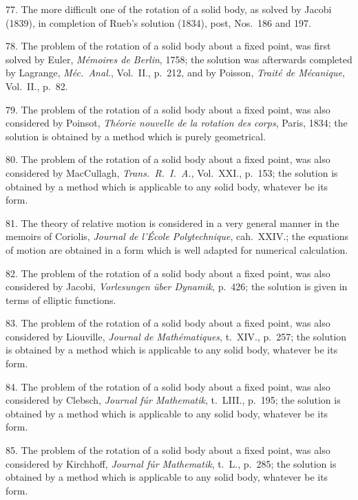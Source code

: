 \documentclass[11pt,a4paper]{article}
\begin{document}
77. The more difficult one of the rotation of a solid body, as solved by Jacobi (1839), in completion of Rueb's solution (1834), post, Nos.~186 and 197.

78. The problem of the rotation of a solid body about a fixed point, was first solved by Euler, \textit{M\'emoires de Berlin}, 1758; the solution was afterwards completed by Lagrange, \textit{M\'ec.\ Anal.}, Vol.~II., p.~212, and by Poisson, \textit{Trait\'e de M\'ecanique}, Vol.~II., p.~82.

\newpage
\setcounter{page}{535}

79. The problem of the rotation of a solid body about a fixed point, was also considered by Poinsot, \textit{Th\'eorie nouvelle de la rotation des corps}, Paris, 1834; the solution is obtained by a method which is purely geometrical.

80. The problem of the rotation of a solid body about a fixed point, was also considered by MacCullagh, \textit{Trans.\ R.\ I.\ A.}, Vol.~XXI., p.~153; the solution is obtained by a method which is applicable to any solid body, whatever be its form.

81. The theory of relative motion is considered in a very general manner in the memoirs of Coriolis, \textit{Journal de l'\'Ecole Polytechnique}, cah.~XXIV.; the equations of motion are obtained in a form which is well adapted for numerical calculation.

82. The problem of the rotation of a solid body about a fixed point, was also considered by Jacobi, \textit{Vorlesungen \"uber Dynamik}, p.~426; the solution is given in terms of elliptic functions.

83. The problem of the rotation of a solid body about a fixed point, was also considered by Liouville, \textit{Journal de Math\'ematiques}, t.~XIV., p.~257; the solution is obtained by a method which is applicable to any solid body, whatever be its form.

84. The problem of the rotation of a solid body about a fixed point, was also considered by Clebsch, \textit{Journal f\'ur Mathematik}, t.~LIII., p.~195; the solution is obtained by a method which is applicable to any solid body, whatever be its form.

\newpage
\setcounter{page}{540}

85. The problem of the rotation of a solid body about a fixed point, was also considered by Kirchhoff, \textit{Journal f\'ur Mathematik}, t.~L., p.~285; the solution is obtained by a method which is applicable to any solid body, whatever be its form.
\end{document}
